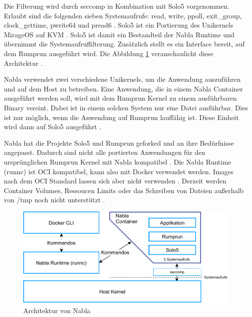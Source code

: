 Die Filterung wird durch seccomp in Kombination mit Solo5 vorgenommen. Erlaubt sind die folgenden sieben Systemaufrufe: read, write, ppoll, exit\_group, clock\_gettime, pwrite64 und pread6  \cite[vgl.][109]{UdoSeidel.2018}. Solo5 ist ein Portierung des Unikernels MirageOS auf \ac{KVM} \cite[vgl.][4]{Williams.2016}. Solo5 ist damit ein Bestandteil der Nabla Runtime und übernimmt die Systemaufruffilterung. Zusätzlich stellt es ein Interface bereit, auf dem Rumprun ausgeführt wird. Die Abbildung \ref{fig:nabla} veranschaulicht diese Architektur  \cite[vgl.][]{Nablacontainers.20190501}. 

Nabla verwendet zwei verschiedene Unikernels, um die Anwendung auszuführen und auf dem Host zu betreiben.
Eine Anwendung, die in einem Nabla Container ausgeführt werden soll, wird mit dem Rumprun Kernel zu einem ausführbaren Binary vereint. Dabei ist in einem solchen System nur eine Datei ausführbar. Dies ist nur möglich, wenn die Anwendung auf Rumprun lauffähig ist. Diese Einheit wird dann auf Solo5 ausgeführt \cite[vgl.][S. 109 f.]{UdoSeidel.2018}. 

Nabla hat die Projekte Solo5 und Rumprun geforked und an ihre Bedürfnisse angepasst. Dadurch sind nicht alle portierten Anwendungen für den ursprünglichen Rumprun Kernel mit Nabla kompatibel  \cite[vgl.][S. 109]{UdoSeidel.2018}.
Die Nabla Runtime (runnc) ist \ac{OCI} kompatibel, kann also mit Docker verwendet werden. Images nach dem \ac{OCI} Standard lassen sich aber nicht verwenden \cite[vgl.][S. 5 f.]{Scholl.2019}. 
Derzeit werden Container Volumes, Ressoucen Limits oder das Schreiben von Dateien außerhalb von /tmp noch nicht unterstützt  \cite[vgl.][]{nablacontainers.20190402}.

\begin{figure}[hb]
	\centering
	\includegraphics[width=1\linewidth]{gfx/nabla_arch.pdf}
	\caption{Architektur von Nabla}
	\label{fig:nabla}
\end{figure}

